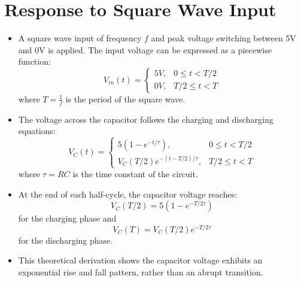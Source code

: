 \documentclass[12pt,a4paper]{report}
\begin{document}
\section{Response to Square Wave Input}
\begin{itemize}
   \item A square wave input of frequency \( f \) and peak voltage switching between 5V and 0V is applied. The input voltage can be expressed as a piecewise function:
\begin{equation}
    V_{in}(t) = \begin{cases} 
        5V, & 0 \leq t < T/2 \\
        0V, & T/2 \leq t < T
    \end{cases}
\end{equation}
where \( T = \frac{1}{f} \) is the period of the square wave.
\item The voltage across the capacitor follows the charging and discharging equations:
\begin{equation}
    V_C(t) = \begin{cases} 
        5(1 - e^{-t/\tau}), & 0 \leq t < T/2 \\
        V_C(T/2) e^{-(t-T/2)/\tau}, & T/2 \leq t < T
    \end{cases}
\end{equation}
where \( \tau = RC \) is the time constant of the circuit.

   \item  At the end of each half-cycle, the capacitor voltage reaches:
\begin{equation}
    V_C(T/2) = 5(1 - e^{-T/2\tau})
\end{equation}
for the charging phase and
\begin{equation}
    V_C(T) = V_C(T/2) e^{-T/2\tau}
\end{equation}
for the discharging phase.

   \item This theoretical derivation shows the capacitor voltage exhibits an exponential rise and fall pattern, rather than an abrupt transition.

\end{itemize}
\end{document}
